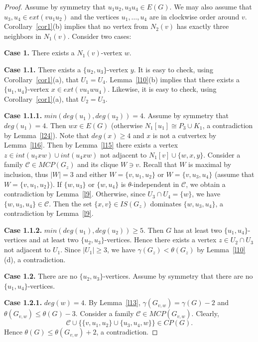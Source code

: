\documentclass[12pt]{article}
\begin{document}
\begin{proof}

Assume by symmetry that $u_1u_2,u_3u_4 \in E(G)$. We may also assume that $u_3,u_4 \in ext(vu_1u_2)$ and the vertices $u_1,\ldots,u_4$ are in clockwise order around $v$. Corollary~\ref{cor1}(b) implies that no vertex from $N_2(v)$ has exactly three neighbors in $N_1(v)$. Consider two cases:

\textbf{Case 1.} There exists a $N_1(v)$-vertex $w$. 

\textbf{Case 1.1.} There exists a $\{u_2,u_3\}$-vertex $y$.  It is easy to check, using Corollary~\ref{cor1}(a), that $U_1 = U_4$. Lemma~\ref{l10}(b) implies that there exists a $\{u_1,u_4\}$-vertex $x \in ext(vu_1wu_4)$. Likewise, it is easy to check, using Corollary~\ref{cor1}(a), that $U_2 = U_3$. 

\textbf{Case 1.1.1.} $min(deg(u_1),deg(u_2)) = 4$. Assume by symmetry that $deg(u_1) = 4$. Then $wx \in E(G)$ (otherwise $N_1[u_1] \cong P_3 \cup K_1$, a contradiction by Lemma~\ref{l24}). Note that $deg(x) \geq 4$ and $x$ is not a cutvertex by Lemma~\ref{l16}. Then by Lemma~\ref{l15} there exists a vertex $z \in int(u_1xw)\cup int(u_4xw)$ not adjacent to $N_1[v] \cup \{w,x,y\}$. Consider a family $\mathcal{C} \in MCP(G_z)$ and its clique $W \ni v$. Recall that $W$ is maximal by inclusion, thus $|W| = 3$ and either $W = \{v,u_1,u_2\}$ or $W = \{v,u_3,u_4\}$ (assume that $W = \{v,u_1,u_2\}$). If $\{w,u_3\}$ or $\{w,u_4\}$ is $\theta$-independent in $\mathcal{C}$, we obtain a contradiction by Lemma~\ref{l9}. Otherwise, since $U_3 \cap U_4 = \{w\}$, we have $\{w,u_3,u_4\} \in \mathcal{C}$. Then the set $\{x,v\} \in IS(G_z)$ dominates $\{w,u_3,u_4\}$, a contradiction by Lemma~\ref{l9}.

\textbf{Case 1.1.2.} $min(deg(u_1),deg(u_2)) \geq 5$. Then $G$ has at least two $\{u_1,u_4\}$-vertices and at least two $\{u_2,u_3\}$-vertices. Hence there exists a vertex $z \in U_2 \cap U_3$ not adjacent to $U_1$. Since $|U_1| \geq 3$, we have $\gamma(G_{z}) < \theta(G_{z})$ by Lemma~\ref{l10}(d), a contradiction. 

\textbf{Case 1.2.} There are no $\{u_2,u_3\}$-vertices. Assume by symmetry that there are no $\{u_1,u_4\}$-vertices.

\textbf{Case 1.2.1.} $deg(w) = 4$. By Lemma~\ref{l13}, $\gamma(G_{v,w}) = \gamma(G) - 2$ and $\theta(G_{v,w}) \leq \theta(G) - 3$. Consider a family $\mathcal{C} \in MCP(G_{v,w})$. Clearly, $$\mathcal{C} \cup \{\{v,u_1,u_2\} \cup \{u_3,u_4,w\}\} \in CP(G).$$ Hence $\theta(G) \leq \theta(G_{v,w}) + 2$, a contradiction.


\end{proof}
\end{document}
